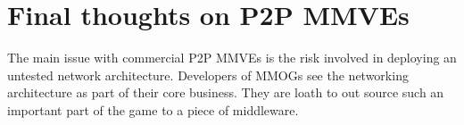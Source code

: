 \section{Final thoughts on P2P MMVEs}

The main issue with commercial P2P MMVEs is the risk involved in deploying an untested network architecture. Developers of MMOGs see the networking architecture as part of their core business. They are loath to out source such an important part of the game to a piece of middleware.


